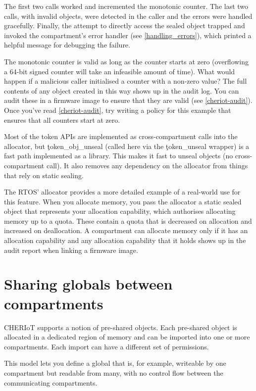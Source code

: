 The first two calls worked and incremented the monotonic counter.
The last two calls, with invalid objects, were detected in the caller and the errors were handled gracefully.
Finally, the attempt to directly access the sealed object trapped and invoked the compartment's error handler (see \ref{handling_errors}), which printed a helpful message for debugging the failure.

The monotonic counter is valid as long as the counter starts at zero (overflowing a 64-bit signed counter will take an infeasible amount of time).
What would happen if a malicious caller initialised a counter with a non-zero value?
The full contents of any object created in this way shows up in the audit log.
You can audit these in a firmware image to ensure that they are valid (see \ref{cheriot-audit}).
Once you've read \ref{cheriot-audit}, try writing a policy for this example that ensures that all counters start at zero.

Most of the token APIs are implemented as cross-compartment calls into the allocator, but \c{token_obj_unseal} (called here via the \c{token_unseal} wrapper) is a fast path implemented as a library.
This makes it fast to unseal objects (no cross-compartment call).
It also removes any dependency on the allocator from things that rely on static sealing.

The RTOS' allocator provides a more detailed example of a real-world use for this feature.
When you allocate memory, you pass the allocator a static sealed object that represents your allocation capability, which authorises allocating memory up to a quota.
These contain a quota that is decreased on allocation and increased on deallocation.
A compartment can allocate memory only if it has an allocation capability and any allocation capability that it holds shows up in the audit report when linking a firmware image.

\section{Sharing globals between compartments}

CHERIoT supports a notion of pre-shared objects.
Each pre-shared object is allocated in a dedicated region of memory and can be imported into one or more compartments.
Each import can have a different set of permissions.

This model lets you define a global that is, for example, writeable by one compartment but readable from many, with no control flow between the communicating compartments.

